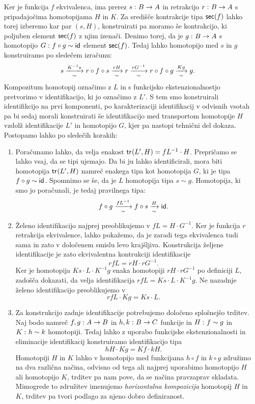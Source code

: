 \begin{dokaz}
  Ker je funkcija \(f\) ekvivalenca, ima prerez \(s \,\colon B \to A\) in retrakcijo \(r \,\colon B \to A\) s pripadajočima homotopijama \(H\) in \(K\). Za središče kontrakcije tipa \(\textnormal{\textsf{sec}}(f)\) lahko torej izberemo kar par \((s, H)\), konstruirati pa moramo še kontrakcijo, ki poljuben element \(\textnormal{\textsf{sec}}(f)\) z njim izenači.
  Denimo torej, da je \(g \,\colon B \to A\) s homotopijo \(G \,\colon f \circ g \sim \textnormal{\textsf{id}}_{}\) element \(\textnormal{\textsf{sec}}(f)\). Tedaj lahko homotopijo med \(s\) in \(g\) konstruiramo po sledečem izračunu:
  \[s \xrightarrow[\sim]{K^{-1}s} r \circ f \circ s \xrightarrow[\sim]{rH}
    r \xrightarrow[\sim]{rG^{-1}} r \circ f \circ g \xrightarrow[\sim]{Kg} g.\]
  Kompozitum homotopij označimo z \(L\) in s funkcijsko ekstenzionalnostjo pretvorimo v identifikacijo, ki jo označimo z \(L'\). S tem smo konstruirali identifikcijo na prvi komponenti, po karakterizaciji identifikacij v odvisnih vsotah pa bi sedaj morali konstruirati še identifikacijo med transportom homotopije \(H\) vzdolž identifikacije \(L'\) in homotopijo \(G\), kjer pa nastopi tehnični del dokaza. Postopamo lahko po sledečih korakih:
  \begin{enumerate}
  \item Poračunamo lahko, da velja enakost \(\textnormal{\textsf{tr}}_{}(L', H) = fL^{-1} \cdot H\). Prepričamo se lahko vsaj, da se tipi ujemajo. Da bi ju lahko identificirali, mora biti homotopija \(\textnormal{\textsf{tr}}_{}(L', H)\) namreč enakega tipa kot homotopija \(G\), ki je tipa \(f \circ g \sim \textnormal{\textsf{id}}_{}\). Spomnimo se še, da je \(L\) homotopija tipa \(s \sim g\). Homotopija, ki smo jo poračunali, je tedaj pravilnega tipa:
    \[f \circ g \xrightarrow[\sim]{fL^{-1}} f \circ s \xrightarrow[\sim]{H} \textnormal{\textsf{id}}_{}.\]

  \item Želeno identifikacijo najprej preoblikujemo v \(fL = H \cdot G^{-1}\). Ker je funkcija \(r\) retrakcija ekvivalence, lahko pokažemo, da je zaradi tega ekvivalenca tudi sama in zato v določenem smislu levo krajšljiva. Konstrukcija željene identifikacije je zato ekvivalentna kontrukciji identifikacije \[rfL = rH \cdot rG^{-1}.\]
    Ker je homotopija \(Ks \cdot L \cdot K^{-1}g\) enaka homotopiji \(rH \cdot rG^{-1}\) po definiciji \(L\), zadošča dokazati, da velja identifikacija \(rfL = Ks \cdot L \cdot K^{-1}g.\)
    Ne nazadnje želeno identifikacijo preoblikujemo v
    \[rfL \cdot Kg = Ks \cdot L.\]

  \item Za konstrukcijo zadnje identifikacije potrebujemo določeno splošnejšo trditev. Naj bodo namreč \(f, g \,\colon A \to B\) in \(h, k \,\colon B \to C\) funkcije in
    \(H \,\colon f \sim g\) in \(K \,\colon h \sim k\) homotopiji. Tedaj lahko z uporabo funkcijske ekstenzionalnosti in eliminacije identifikacij konstruiramo identifikacijo tipa
    \[hH \cdot Kg = Kf \cdot kH.\]
    Homotopiji \(H\) in \(K\) lahko v homotopijo med funkcijama \(h \circ f\) in \(k \circ g\) združimo na dva različna načina, odvisno od tega ali najprej uporabimo homotopijo \(H\) ali homotopijo \(K\), trditev pa nam pove, da se načina pravzaprav skladata. Mimogrede to združitev imenujemo \emph{horizontalna kompozicija} homotopij \(H\) in \(K\), trditev pa tvori podlago za njeno dobro definiranost.


\end{enumerate}
\end{dokaz}
